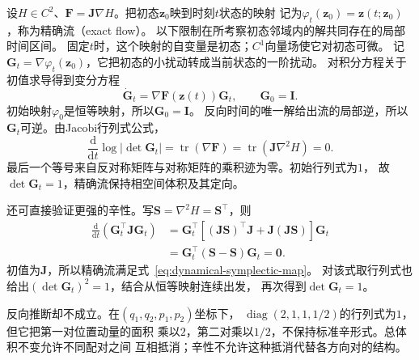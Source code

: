 设$H\in C^2$、$\bm F=\bm J\nabla H$。把初态$\bm z_0$映到时刻$t$状态的映射
记为$\varphi_t(\bm z_0)=\bm z(t;\bm z_0)$，称为精确流（exact flow）。
以下限制在所考察初态邻域内的解共同存在的局部时间区间。
固定$t$时，这个映射的自变量是初态；$C^1$向量场使它对初态可微。
记$\bm G_t=\nabla\varphi_t(\bm z_0)$，它把初态的小扰动转成当前状态的一阶扰动。
对积分方程关于初值求导得到变分方程
\[
  \dot{\bm G}_t=\nabla\bm F(\bm z(t))\bm G_t,\qquad \bm G_0=\bm I.
\]
初始映射$\varphi_0$是恒等映射，所以$\bm G_0=\bm I$。
反向时间的唯一解给出流的局部逆，所以$\bm G_t$可逆。由Jacobi行列式公式，
\[
  \frac{\mathrm d}{\mathrm dt}\log|\det\bm G_t|
  =\operatorname{tr}(\nabla\bm F)
  =\operatorname{tr}(\bm J\nabla^2H)=0.
\]
最后一个等号来自反对称矩阵与对称矩阵的乘积迹为零。初始行列式为$1$，
故$\det\bm G_t=1$，精确流保持相空间体积及其定向。

还可直接验证更强的辛性。写$\bm S=\nabla^2H=\bm S^\top$，则
\[
  \begin{aligned}
    \frac{\mathrm d}{\mathrm dt}(\bm G_t^\top\bm J\bm G_t)
    &=\bm G_t^\top[(\bm J\bm S)^\top\bm J
                         +\bm J(\bm J\bm S)]\bm G_t\\
    &=\bm G_t^\top(\bm S-\bm S)\bm G_t=\bm0.
  \end{aligned}
\]
初值为$\bm J$，所以精确流满足式~\eqref{eq:dynamical-symplectic-map}。
对该式取行列式也给出$(\det\bm G_t)^2=1$，结合从恒等映射连续出发，
再次得到$\det\bm G_t=1$。

反向推断却不成立。在$(q_1,q_2,p_1,p_2)$坐标下，
$\operatorname{diag}(2,1,1,1/2)$的行列式为$1$，但它把第一对位置动量的面积
乘以$2$，第二对乘以$1/2$，不保持标准辛形式。总体积不变允许不同配对之间
互相抵消；辛性不允许这种抵消代替各方向对的结构。

